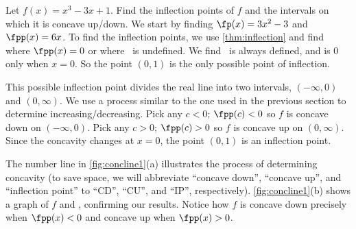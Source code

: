 \begin{example}\label{ex_conc1}%
Let $f(x)=x^3-3x+1$. Find the inflection points of $f$ and the intervals on which it is concave up/down.
\solution
We start by finding $\fp(x)=3x^2-3$ and $\fpp(x)=6x$.  To find the inflection points, we use \autoref{thm:inflection} and find where $\fpp(x)=0$ or where \fpp\ is undefined. We find \fpp\ is always defined, and is 0 only when $x=0$. So the point $(0,1)$ is the only possible point of inflection.


This possible inflection point divides the real line into two intervals, $(-\infty,0)$ and $(0,\infty)$. We use a process similar to the one used in the previous section to determine increasing/decreasing. Pick any $c<0$; $\fpp(c)<0$ so $f$ is concave down on $(-\infty,0)$. Pick any $c>0$; $\fpp(c)>0$ so $f$ is concave up on $(0,\infty)$. Since the concavity changes at $x=0$, the point $(0,1)$ is an inflection point.

The number line in \autoref{fig:concline1}(a) illustrates the process of determining concavity (to save space, we will abbreviate ``concave down'', ``concave up'', and ``inflection point'' to ``CD'', ``CU'', and ``IP'', respectively). \autoref{fig:concline1}(b) shows a graph of $f$ and \fpp, confirming our results. Notice how $f$ is concave down precisely when $\fpp(x)<0$ and concave up when $\fpp(x)>0$.
\end{example}

